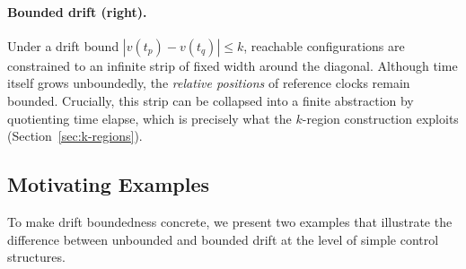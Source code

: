\paragraph{Bounded drift (right).} Under a drift bound $|v(t_p) - v(t_q)| \le k$, reachable configurations are constrained to an infinite strip of fixed width around the diagonal. Although time itself grows unboundedly, the \emph{relative positions} of reference clocks remain bounded. Crucially, this strip can be collapsed into a finite abstraction by quotienting time elapse, which is precisely what the $k$-region construction exploits (Section~\ref{sec:k-regions}).

\subsection{Motivating Examples}

To make drift boundedness concrete, we present two examples that illustrate the difference between unbounded and bounded drift at the level of simple control structures.


